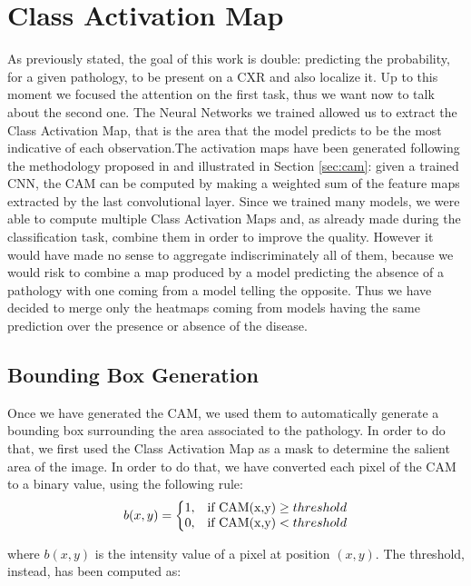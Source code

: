 \section{Class Activation Map}
\label{sec:class_activation_map}
As previously stated, the goal of this work is double: predicting the probability, for a given pathology, to be present on a \ac{CXR} and also localize it. Up to this moment we focused the attention on the first task, thus we want now to talk about the second one. 
The Neural Networks we trained allowed us to extract the Class Activation Map, that is the area that the model predicts to be the most indicative of each observation.The activation maps have been generated following the methodology proposed in \cite{cam_paper} and illustrated in Section \ref{sec:cam}: given a trained \ac{CNN}, the \ac{CAM} can be computed by making a weighted sum of the feature maps extracted by the last convolutional layer. Since we trained many models, we were able to compute multiple Class Activation Maps and, as already made during the classification task, combine them in order to improve the quality. However it would have made no sense to aggregate indiscriminately all of them, because we would risk to combine a map produced by a model predicting the absence of a pathology with one coming from a model telling the opposite. Thus we have decided to merge only the heatmaps coming from models having the same prediction over the presence or absence of the disease. 

\subsection{Bounding Box Generation}
\label{sec:bounding_box}
Once we have generated the \ac{CAM}, we used them to automatically generate a bounding box surrounding the area associated to the pathology. In order to do that, we first used the Class Activation Map as a mask to determine the salient area of the image. In order to do that, we have converted each pixel of the \ac{CAM} to a binary value, using the following rule:
\begin{equation}
    b(x,y) = \left\{\begin{matrix}
1, & \textup{if CAM(x,y)} \geq  threshold 
\\ 
0, & \textup{if CAM(x,y)} < threshold 
\end{matrix}\right.
\label{eq:cam_mask}
\end{equation}

where $b(x,y)$ is the intensity value of a pixel at position $(x,y)$. The threshold, instead, has been computed as:

